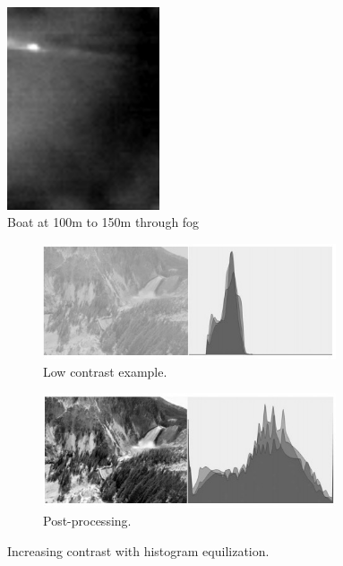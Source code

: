 \begin{figure}
\centering
\includegraphics[width=0.4\textwidth]{"./image/washed-out_example"}
\caption{Boat at 100m to 150m through fog}
\label{fig:washedOut}
\end{figure}

\begin{figure}
\centering
\begin{subfigure}{0.4\textwidth}
 \centering
 \includegraphics[width=0.95\textwidth]{"./image/hist_equil_1"}
 \caption{Low contrast example.}
 \label{fig:hist_equil:sub1}
\end{subfigure}
\begin{subfigure}{0.4\textwidth}
 \centering
 \includegraphics[width=0.95\textwidth]{"./image/hist_equil_2"}
 \caption{Post-processing.}
 \label{fig:hist_equil:sub2}
\end{subfigure}
\caption{Increasing contrast with histogram equilization.}
\label{fig:hist_equil}
\end{figure}


